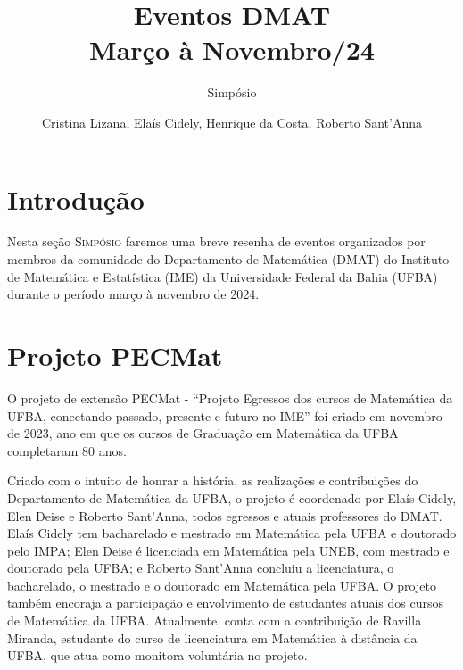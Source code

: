 \documentclass{hipatia}
\title{Eventos DMAT \\ Março à Novembro/24}
\subtitle{Simpósio}
\author{Cristina Lizana, Elaís Cidely, Henrique da Costa, Roberto Sant'Anna}
\begin{document}
\setcounter{page}{\simposiopage}
\maketitle



\section{Introdução}

Nesta seção \textsc{Simpósio}  faremos uma breve resenha de eventos organizados por membros da comunidade do Departamento de Matemática (DMAT) do Instituto de Matemática e Estatística (IME) da Universidade Federal da Bahia (UFBA) durante o período março à novembro de 2024. 


%
%

\section{Projeto PECMat}

O projeto de extensão PECMat - ``Projeto Egressos dos cursos de Matemática da UFBA, conectando passado, presente e futuro no IME'' foi criado em novembro de 2023, ano em que os cursos de Graduação em Matemática da UFBA completaram  80 anos.

Criado com o intuito de honrar a história, as  realizações e contribuições do Departamento de Matemática da UFBA, o projeto é coordenado por Elaís Cidely, Elen Deise e Roberto Sant'Anna, todos egressos e atuais professores do DMAT. Elaís Cidely tem bacharelado e mestrado em Matemática pela UFBA e doutorado pelo IMPA; Elen Deise é licenciada em Matemática pela UNEB, com mestrado e doutorado pela UFBA; e Roberto Sant'Anna concluiu a licenciatura, o bacharelado, o mestrado e o doutorado em Matemática pela UFBA. O projeto também encoraja a participação e envolvimento de estudantes atuais dos cursos de Matemática da UFBA. Atualmente, conta com a contribuição de Ravilla Miranda, estudante do curso de licenciatura em Matemática à distância da UFBA, que atua como monitora voluntária no projeto.
\end{document}
